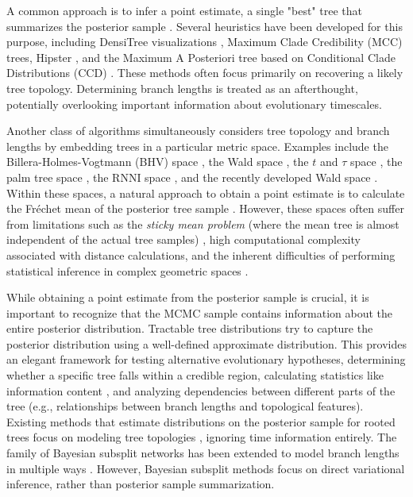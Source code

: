\documentclass[10pt,letterpaper]{article}
\begin{document}
A common approach is to infer a point estimate, a single "best" tree that summarizes the posterior sample \cite{treesinforest}. Several heuristics have been developed for this purpose, including DensiTree visualizations \cite{densitree}, Maximum Clade Credibility (MCC) trees, Hipster \cite{hipstr}, and the Maximum A Posteriori tree based on Conditional Clade Distributions (CCD) \cite{ccd,ccdlarget}. These methods often focus primarily on recovering a likely tree topology. Determining branch lengths is treated as an afterthought, potentially overlooking important information about evolutionary timescales.

Another class of algorithms simultaneously considers tree topology and branch lengths by embedding trees in a particular metric space. Examples include the Billera-Holmes-Vogtmann (BHV) space \cite{bhv}, the Wald space \cite{wald}, the $t$ and $\tau$ space \cite{tauspace}, the palm tree space \cite{tropical}, the RNNI space \cite{rnnispace}, and the recently developed Wald space \cite{wald}. Within these spaces, a natural approach to obtain a point estimate is to calculate the Fréchet mean of the posterior tree sample \cite{frechetmeanvar}. However, these spaces often suffer from limitations such as the \emph{sticky mean problem} (where the mean tree is almost independent of the actual tree samples) \cite{sticky}, high computational complexity associated with distance calculations, and the inherent difficulties of performing statistical inference in complex geometric spaces \cite{riemanngaussian}.

While obtaining a point estimate from the posterior sample is crucial, it is important to recognize that the MCMC sample contains information about the entire posterior distribution. Tractable tree distributions \cite{ccd} try to capture the posterior distribution using a well-defined approximate distribution. This provides an elegant framework for testing alternative evolutionary hypotheses, determining whether a specific tree falls within a credible region, calculating statistics like information content \cite{informationcontent}, and analyzing dependencies between different parts of the tree (e.g., relationships between branch lengths and topological features). Existing methods that estimate distributions on the posterior sample for rooted trees focus on modeling tree topologies \cite{ccd,ccdlarget}, ignoring time information entirely. The family of Bayesian subsplit networks \cite{subsplit} has been extended to model branch lengths in multiple ways \cite{subsplitnf,subsplitbranchlengths}. However, Bayesian subsplit methods focus on direct variational inference, rather than posterior sample summarization.
\end{document}
